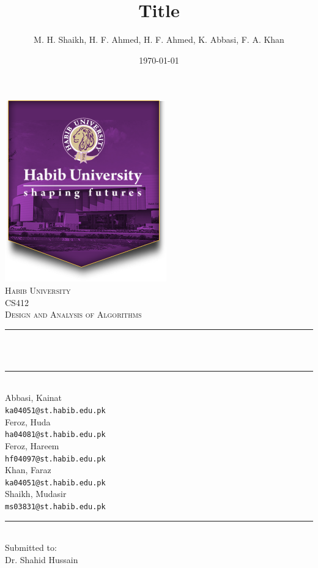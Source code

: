 \documentclass[12pt]{article}
\title{Title}								%
\author{M. H. Shaikh, H. F. Ahmed, H. F. Ahmed, K. Abbasi, F. A. Khan}								%
\date{\today}											%
\makeatletter
\let\thetitle\@title
\let\thedate\@date
\makeatother
\begin{document}

\begin{titlepage}
	\centering
    \vspace*{0.5 cm}
    \includegraphics[scale = 0.47]{logo.png}\\[1.0 cm]	%
    \textsc{\LARGE Habib University}\\[1.0 cm]	%
	\textsc{\Large CS412}\\[0.5 cm]				%
	\textsc{\large Design and Analysis of Algorithms}\\[0.5 cm]				%
	\rule{\linewidth}{0.2 mm} \\[0.4 cm]
	{ \huge \bfseries \thetitle}\\
	\rule{\linewidth}{0.2 mm} \\[0.5 cm]
	{Abbasi, Kainat\\
            \texttt{ka04051@st.habib.edu.pk}} \\
    {Feroz, Huda\\
    \texttt{ha04081@st.habib.edu.pk}} \\
    {Feroz, Hareem\\
    \texttt{hf04097@st.habib.edu.pk}} \\
    {Khan, Faraz\\
            \texttt{ka04051@st.habib.edu.pk}} \\
	{Shaikh, Mudasir\\
            \texttt{ms03831@st.habib.edu.pk}} \\
	\rule{\linewidth}{0.2 mm} \\[0.5 cm]
	{Submitted to:}\\
			Dr. Shahid  Hussain \\
	{\large \thedate}\\[2 cm]
	\vfill
	
\end{titlepage}
\end{document}
